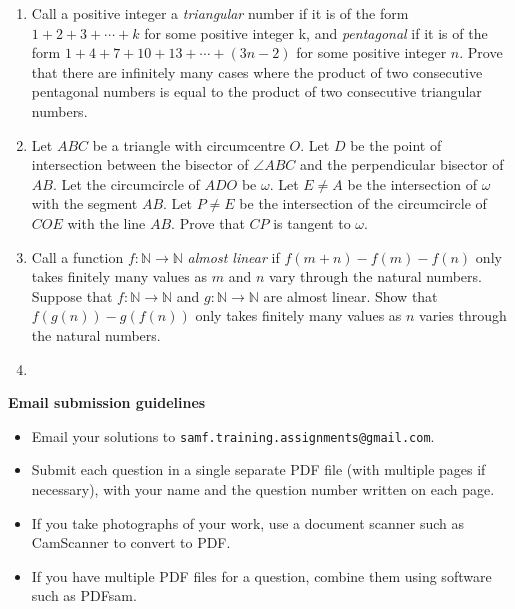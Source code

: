 \documentclass{article}
\begin{document}
\begin{enumerate}[1.]
\vspace{6pt}
\item %
Call a positive integer a \emph{triangular} number if it is of the form $1 +2 +3 +\dotsb +k$ for some positive integer k, and \emph{pentagonal} if it is of the form $1 +4 +7 +10 +13 +\dotsb +(3n-2)$ for some positive integer $n$. Prove that there are infinitely many cases where the product of two consecutive pentagonal numbers is equal to the product of two consecutive triangular numbers.


\vspace{6pt}
\item %
Let $ABC$ be a triangle with circumcentre $O$. Let $D$ be the point of intersection between the bisector of $\angle ABC$ and the perpendicular bisector of $AB$. Let the circumcircle of $ADO$ be $\omega$. Let $E\neq A$ be the intersection of $\omega$ with the segment $AB$. Let $P\neq E$ be the intersection of the circumcircle of $COE$ with the line $AB$. Prove that $CP$ is tangent to $\omega$.


\vspace{6pt}
\item %
Call a function $f : \mathbb{N} \to \mathbb{N}$ \emph{almost linear} if $f(m + n) - f(m) - f(n)$ only takes finitely many values as $m$ and $n$ vary through the natural numbers. Suppose that $f : \mathbb{N} \to \mathbb{N}$ and $g : \mathbb{N} \to \mathbb{N}$ are almost linear. Show that $f(g(n)) - g(f(n))$ only takes finitely many values as $n$ varies through the natural numbers.


\vspace{6pt}
\item


\end{enumerate}

\vfill
\textbf{\Large Email submission guidelines}
\begin{itemize}
	\item Email your solutions to \verb!samf.training.assignments@gmail.com!.
	\item Submit each question in a single separate PDF file (with multiple pages if necessary), with your name and the question number written on each page.
	\item If you take photographs of your work, use a document scanner such as CamScanner to convert to PDF.
	\item If you have multiple PDF files for a question, combine them using software such as PDFsam.
\end{itemize}
\end{document}
